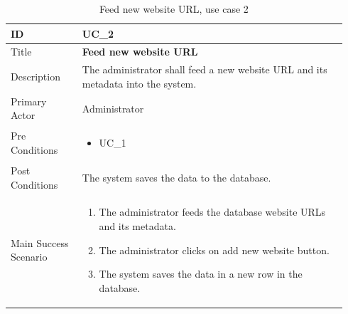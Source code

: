 \documentclass{scrartcl}
\begin{document}
\begin{table}[H]
  \caption{Feed new website URL, use case 2}
  \begin{tabular}{p{0.20\linewidth} | p{0.74\linewidth}}
    \toprule
    ID & UC\_2
    \\\midrule
    Title & \textbf{Feed new website URL}
    \\\hline
    Description & The administrator shall feed a new website URL and its metadata into the system.
    \\\hline
    Primary Actor & Administrator
    \\\hline
    Pre Conditions & {
                     \begin{itemize}
                     \item UC\_1
                     \end{itemize}
                     }\vspace*{-\baselineskip}
    \\\hline
    Post Conditions & The system saves the data to the database.
    \\\hline
    Main Success Scenario & {
                            \begin{enumerate}
                            \item The administrator feeds the database website URLs and its metadata.
                            \item The administrator clicks on add new website button.
                            \item The system saves the data in a new row in the database.
                            \end{enumerate}
                            }\vspace*{-\baselineskip}
    \\\bottomrule
  \end{tabular}
\end{table}
\end{document}
